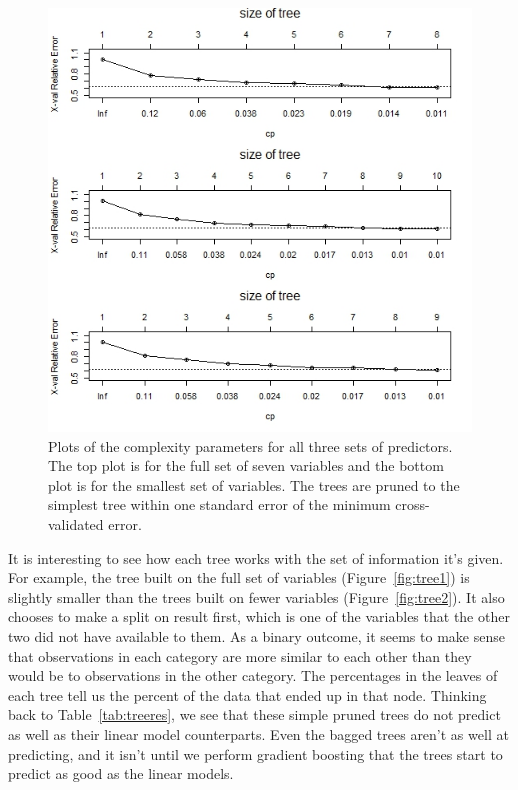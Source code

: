 \documentclass[12pt]{article}\usepackage[]{graphicx}\usepackage[]{color}
\begin{document}
\begin{figure}[h]
\centering
\includegraphics[width=.9\textwidth]{treecp.jpeg}
\captionsetup{font=footnotesize,labelfont=footnotesize}
\caption{\label{fig:treecp} Plots of the complexity parameters for all three sets of predictors. The top plot is for the full set of seven variables and the bottom plot is for the smallest set of variables. The trees are pruned to the simplest tree within one standard error of the minimum cross-validated error.}
\end{figure}

\newpage
It is interesting to see how each tree works with the set of information it's given. For example, the tree built on the full set of variables (Figure~\ref{fig:tree1}) is slightly smaller than the trees built on fewer variables (Figure~\ref{fig:tree2}). It also chooses to make a split on result first, which is one of the variables that the other two did not have available to them. As a binary outcome, it seems to make sense that observations in each category are more similar to each other than they would be to observations in the other category. The percentages in the leaves of each tree tell us the percent of the data that ended up in that node. Thinking back to Table~\ref{tab:treeres}, we see that these simple pruned trees do not predict as well as their linear model counterparts. Even the bagged trees aren't as well at predicting, and it isn't until we perform gradient boosting that the trees start to predict as good as the linear models.
\end{document}
